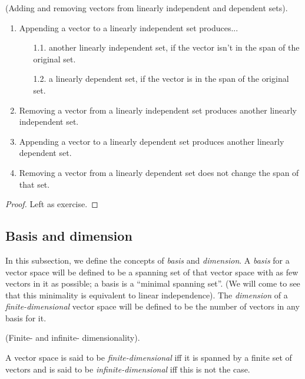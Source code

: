 \begin{lemma}
    \label{ch::lin_alg::lemma::adding_removing_vectors_li_ld_sets}
    (Adding and removing vectors from linearly independent and dependent sets).

    \begin{enumerate}
        \item Appending a vector to a linearly independent set produces...
        \begin{enumerate}
            \item[1.1.] another linearly independent set, if the vector isn't in the span of the original set.
            \item[1.2.] a linearly dependent set, if the vector is in the span of the original set.
        \end{enumerate}
        \item Removing a vector from a linearly independent set produces another linearly independent set.
        \item Appending a vector to a linearly dependent set produces another linearly dependent set.
        \item Removing a vector from a linearly dependent set does not change the span of that set.
    \end{enumerate}
\end{lemma}

\begin{proof}
   Left as exercise.
\end{proof}


\newpage

\subsection*{Basis and dimension}

In this subsection, we define the concepts of \textit{basis} and \textit{dimension}. A \textit{basis} for a vector space will be defined to be a spanning set of that vector space with as few vectors in it as possible; a basis is a ``minimal spanning set''. (We will come to see that this minimality is equivalent to linear independence). The \textit{dimension} of a \textit{finite-dimensional} vector space will be defined to be the number of vectors in any basis for it.

\begin{defn}
    (Finite- and infinite- dimensionality).
    
    A vector space is said to be \textit{finite-dimensional} iff it is spanned by a finite set of vectors and is said to be \textit{infinite-dimensional} iff this is not the case.
\end{defn}

